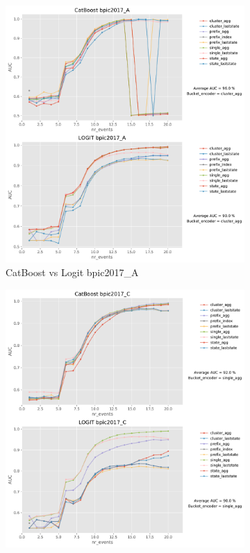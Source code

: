 \documentclass[twoside,11pt]{Latex/Classes/PhDthesisPSnPDF}
\begin{document}
\begin{figure}[t!]
	\begin{subfigure}{0.48\textwidth}
		\includegraphics[width=\linewidth]{images/catboost/graphslogit/bpic2017_A_CatBoost_logit.pdf}
		\caption{CatBoost vs Logit bpic2017\_A} \label{fig:b17acl}
	\end{subfigure}\hspace*{\fill}
	\begin{subfigure}{0.48\textwidth}
		\includegraphics[width=\linewidth]{images/catboost/graphslogit/bpic2017_C_CatBoost_logit.pdf}

\end{subfigure}
\end{figure}
\end{document}

